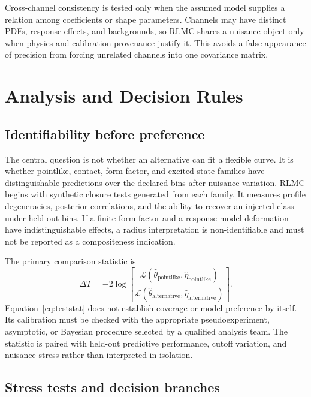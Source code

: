 Cross-channel consistency is tested only when the assumed model supplies a relation among coefficients or shape parameters. Channels may have distinct PDFs, response effects, and backgrounds, so RLMC shares a nuisance object only when physics and calibration provenance justify it. This avoids a false appearance of precision from forcing unrelated channels into one covariance matrix.

\section{Analysis and Decision Rules}

\subsection{Identifiability before preference}

The central question is not whether an alternative can fit a flexible curve. It is whether pointlike, contact, form-factor, and excited-state families have distinguishable predictions over the declared bins after nuisance variation. RLMC begins with synthetic closure tests generated from each family. It measures profile degeneracies, posterior correlations, and the ability to recover an injected class under held-out bins. If a finite form factor and a response-model deformation have indistinguishable effects, a radius interpretation is non-identifiable and must not be reported as a compositeness indication.

The primary comparison statistic is
\begin{equation}
\Delta T=-2\log
\left[
\frac{\mathcal{L}(\widehat{\theta}_{\mathrm{pointlike}},\widehat{\eta}_{\mathrm{pointlike}})}
{\mathcal{L}(\widehat{\theta}_{\mathrm{alternative}},\widehat{\eta}_{\mathrm{alternative}})}
\right].
\label{eq:teststat}
\end{equation}
Equation~\eqref{eq:teststat} does not establish coverage or model preference by itself. Its calibration must be checked with the appropriate pseudoexperiment, asymptotic, or Bayesian procedure selected by a qualified analysis team. The statistic is paired with held-out predictive performance, cutoff variation, and nuisance stress rather than interpreted in isolation.

\subsection{Stress tests and decision branches}

